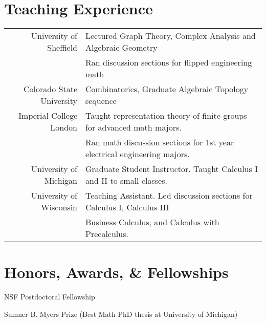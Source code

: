 \documentclass[11pt,letterpaper]{article}
\renewenvironment{itemize}{
  \begin{list}{}{
    \setlength{\leftmargin}{1.5em}
  }
}{
  \end{list}
}
\begin{document}
\section*{Teaching Experience}
\begin{tabular}{rl}
University of Sheffield & Lectured Graph Theory, Complex Analysis and Algebraic Geometry \\
& Ran discussion sections for flipped engineering math \\
\rule{0pt}{3ex}Colorado State University & Combinatorics, Graduate Algebraic Topology sequence \\
\rule{0pt}{3ex}Imperial College London & Taught representation theory of finite groups for advanced math majors.  \\
& Ran math discussion sections for 1st year electrical engineering majors. \\
\rule{0pt}{3ex}University of Michigan & Graduate Student Instructor. Taught Calculus I and II to small classes. \\
\rule{0pt}{3ex}University of Wisconsin &  Teaching Assistant. Led discussion sections for Calculus I, Calculus III \\
&  Business Calculus, and Calculus with Precalculus. \\
\end{tabular}


\section*{Honors, Awards, \& Fellowships}

\begin{itemize}
\item NSF Postdoctoral Fellowship
\item Sumner B. Myers Prize (Best Math PhD thesis at University of Michigan)
\end{itemize}
\end{document}
